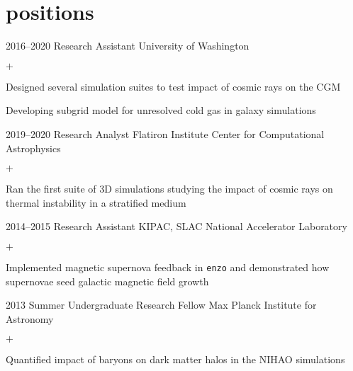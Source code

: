 \documentclass[]{luger-cv} %
\begin{document}
\section{positions}
\begin{entrylist}


\entry
{2016--2020}
{Research Assistant}
{University of Washington}
{%
\vspace{-1em}
\begin{list}{$+$}{\cvlist}
\item Designed several simulation suites to test impact of cosmic rays on the CGM
\item Developing subgrid model for unresolved cold gas in galaxy simulations
\end{list}
}


\entry
{2019--2020}
{Research Analyst}
{Flatiron Institute Center for Computational Astrophysics}
{%
\vspace{-1em}
\begin{list}{$+$}{\cvlist}
\item Ran the first suite of 3D simulations studying the impact of cosmic rays on thermal instability in a stratified medium
\end{list}
}


\entry
{2014--2015}
{Research Assistant}
{KIPAC, SLAC National Accelerator Laboratory}
{%
\vspace{-1em}
\begin{list}{$+$}{\cvlist}
\item Implemented magnetic supernova feedback in \texttt{enzo} and demonstrated how supernovae seed galactic magnetic field growth
\end{list}
}


\ifdefined \onepage \else
\entry
{2013}
{Summer Undergraduate Research Fellow}
{Max Planck Institute for Astronomy}
{%
\vspace{-1em}
\begin{list}{$+$}{\cvlist}
\item Quantified impact of baryons on dark matter halos in the NIHAO simulations
\end{list}
}
\fi


\end{entrylist}
\end{document}
